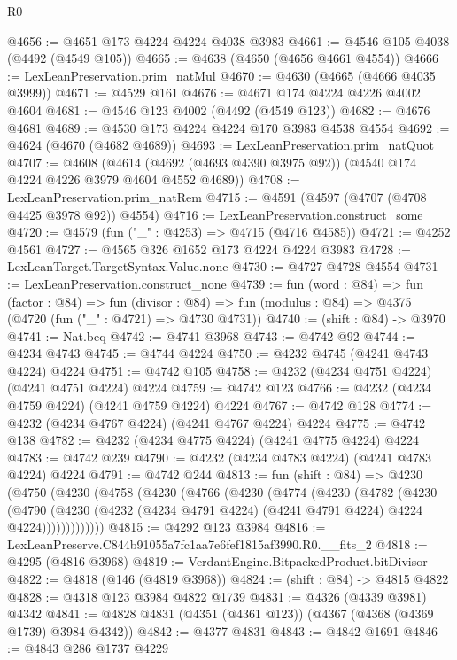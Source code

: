 \begin{lexlean}{R0}
\begin{coremodule}
@4656 := @4651 @173 @4224 @4224 @4038 @3983
@4661 := @4546 @105 @4038 (@4492 (@4549 @105))
@4665 := @4638 (@4650 (@4656 @4661 @4554))
@4666 := LexLeanPreservation.prim_natMul
@4670 := @4630 (@4665 (@4666 @4035 @3999))
@4671 := @4529 @161
@4676 := @4671 @174 @4224 @4226 @4002 @4604
@4681 := @4546 @123 @4002 (@4492 (@4549 @123))
@4682 := @4676 @4681
@4689 := @4530 @173 @4224 @4224 @170 @3983 @4538 @4554
@4692 := @4624 (@4670 (@4682 @4689))
@4693 := LexLeanPreservation.prim_natQuot
@4707 := @4608
    (@4614 (@4692 (@4693 @4390 @3975 @92)) (@4540 @174 @4224 @4226 @3979 @4604 @4552 @4689))
@4708 := LexLeanPreservation.prim_natRem
@4715 := @4591 (@4597 (@4707 (@4708 @4425 @3978 @92)) @4554)
@4716 := LexLeanPreservation.construct_some
@4720 := @4579 (fun ("_" : @4253) => @4715 (@4716 @4585))
@4721 := @4252 @4561
@4727 := @4565 @326 @1652 @173 @4224 @4224 @3983
@4728 := LexLeanTarget.TargetSyntax.Value.none
@4730 := @4727 @4728 @4554
@4731 := LexLeanPreservation.construct_none
@4739 := fun (word : @84) =>
  fun (factor : @84) =>
  fun (divisor : @84) => fun (modulus : @84) => @4375 (@4720 (fun ("_" : @4721) => @4730 @4731))
@4740 := (shift : @84) -> @3970
@4741 := Nat.beq
@4742 := @4741 @3968
@4743 := @4742 @92
@4744 := @4234 @4743
@4745 := @4744 @4224
@4750 := @4232 @4745 (@4241 @4743 @4224) @4224
@4751 := @4742 @105
@4758 := @4232 (@4234 @4751 @4224) (@4241 @4751 @4224) @4224
@4759 := @4742 @123
@4766 := @4232 (@4234 @4759 @4224) (@4241 @4759 @4224) @4224
@4767 := @4742 @128
@4774 := @4232 (@4234 @4767 @4224) (@4241 @4767 @4224) @4224
@4775 := @4742 @138
@4782 := @4232 (@4234 @4775 @4224) (@4241 @4775 @4224) @4224
@4783 := @4742 @239
@4790 := @4232 (@4234 @4783 @4224) (@4241 @4783 @4224) @4224
@4791 := @4742 @244
@4813 := fun (shift : @84) =>
  @4230
    (@4750
      (@4230
        (@4758
          (@4230
            (@4766
              (@4230
                (@4774
                  (@4230
                    (@4782
                      (@4230
                        (@4790
                          (@4230
                            (@4232 (@4234 @4791 @4224) (@4241 @4791 @4224) @4224 @4224)))))))))))))
@4815 := @4292 @123 @3984
@4816 := LexLeanPreserve.C844b91055a7fc1aa7e6fef1815af3990.R0.__fits_2
@4818 := @4295 (@4816 @3968)
@4819 := VerdantEngine.BitpackedProduct.bitDivisor
@4822 := @4818 (@146 (@4819 @3968))
@4824 := (shift : @84) -> @4815 @4822
@4828 := @4318 @123 @3984 @4822 @1739
@4831 := @4326 (@4339 @3981) @4342
@4841 := @4828 @4831 (@4351 (@4361 @123)) (@4367 (@4368 (@4369 @1739) @3984 @4342))
@4842 := @4377 @4831
@4843 := @4842 @1691
@4846 := @4843 @286 @1737 @4229

\end{coremodule}
\end{lexlean}
